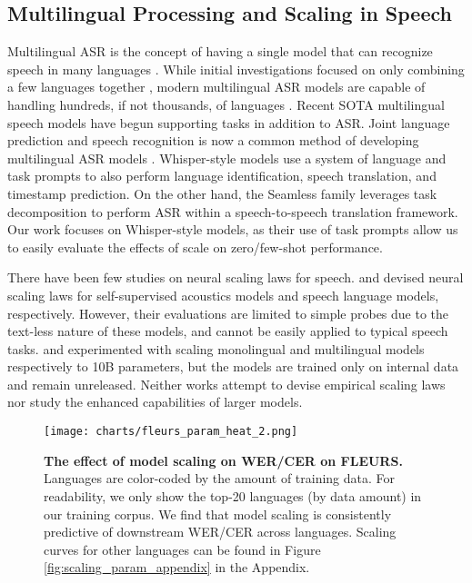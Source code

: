 \subsection{Multilingual Processing and Scaling in Speech}
\vspace{-0.2cm}

Multilingual ASR is the concept of having a single model that can recognize speech in many languages \cite{watanabemulitlingual}. While initial investigations focused on only combining a few languages together \cite{conneau2020unsupervised}, modern multilingual ASR models are capable of handling hundreds, if not thousands, of languages \cite{google-usm, pratap2023scaling, chen-etal-2024-towards-robust, whisper, asr2k}. Recent SOTA multilingual speech models have begun supporting tasks in addition to ASR. Joint language prediction and speech recognition is now a common method of developing multilingual ASR models \cite{chenImproving, whisper}. Whisper-style models \cite{whisper, asru23-owsm} use a system of language and task prompts to also perform language identification, speech translation, and timestamp prediction. On the other hand, the Seamless family \cite{barrault2023seamless, barrault2023seamlessm4t} leverages task decomposition to perform ASR within a speech-to-speech translation framework. Our work focuses on Whisper-style models, as their use of task prompts allow us to easily evaluate the effects of scale on zero/few-shot performance.

There have been few studies on neural scaling laws for speech. \citet{droppo21_interspeech} and \citet{cuervo-marxer-2024-scaling} devised neural scaling laws for self-supervised acoustics models and speech language models, respectively. However, their evaluations are limited to simple probes due to the text-less nature of these models, and cannot be easily applied to typical speech tasks. \citet{zheng22d_scaling_mono_asr} and \citet{li_scaling_multi_asr} experimented with scaling monolingual and multilingual models respectively to 10B parameters, but the models are trained only on internal data and remain unreleased. Neither works attempt to devise empirical scaling laws nor study the enhanced capabilities of larger models.


\begin{figure*}
    \centering
    \texttt{[image: charts/fleurs\_param\_heat\_2.png]}
    \vspace{-0.4cm}
    \caption{\textbf{The effect of model scaling on WER/CER on FLEURS.} Languages are color-coded by the amount of training data. For readability, we only show the top-20 languages (by data amount) in our training corpus. We find that model scaling is consistently predictive of downstream WER/CER across languages. Scaling curves for other languages can be found in Figure \ref{fig:scaling_param_appendix} in the Appendix.}
    \vspace{-0.4cm}
    \label{fig:scaling_param}
\end{figure*}

\vspace{-0.2cm}